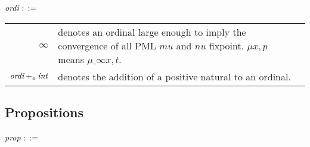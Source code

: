 \noindent \emph{ordi} $::=$

\def\w{9.2cm}
\begin{longtable}{rll}
  $\infty$ & \parbox[t]{\w}{denotes an ordinal large enough to imply the
    convergence of all PML $mu$ and $nu$ fixpoint. $\mu x, p$ means $\mu\_\infty x, t$. } \\
  $\emph{ordi} +_o \emph{int}$ & \parbox[t]{\w}{denotes the addition
    of a positive natural to an ordinal.} \\
\end{longtable}

\subsection{Propositions}

\noindent \emph{prop} $::=$

